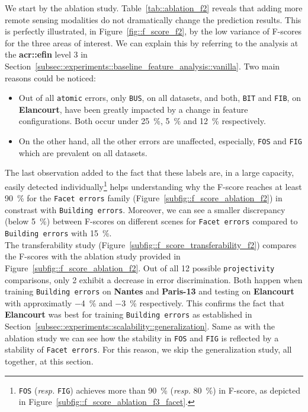         We start by the ablation study.
        Table~\ref{tab::ablation_f2} reveals that adding more remote sensing modalities do not dramatically change the prediction results.
        This is perfectly illustrated, in Figure~\ref{fig::f_score_f2}, by the low variance of F-scores for the three areas of interest.
        We can explain this by referring to the analysis at the \textbf{\gls{acr::efin}} level 3 in Section~\ref{subsec::experiments::baseline_feature_analysis::vanilla}.
        Two main reasons could be noticed:
        \begin{itemize}[label=\(\blacktriangleright\)]
            \item Out of all \texttt{atomic} errors, only \texttt{BUS}, on all datasets, and both, \texttt{BIT} and \texttt{FIB}, on \textbf{Elancourt}, have been greatly impacted by a change in feature configurations.
                    Both occur under \SI{25}{\percent}, \SI{5}{\percent} and \SI{12}{\percent} respectively.
            \item On the other hand, all the other errors are unaffected, especially, \texttt{FOS} and \texttt{FIG} which are prevalent on all datasets.
        \end{itemize}
        The last observation added to the fact that these labels are, in a large capacity, easily detected individually\footnote{
            \texttt{FOS} (\textit{resp.} \texttt{FIG}) achieves more than \SI{90}{\percent} (\textit{resp.} \SI{80}{\percent}) in F-score, as depicted in Figure~\ref{subfig::f_score_ablation_f3_facet}.
        } helps understanding why the F-score reaches at least \SI{90}{\percent} for the \texttt{Facet errors} family (Figure~\ref{subfig::f_score_ablation_f2}) in constrast with \texttt{Building errors}.
        Moreover, we can see a smaller discrepancy (below \SI{5}{\percent}) between F-scores on different scenes for \texttt{Facet errors} compared to \texttt{Building errors} with \SI{15}{\percent}.\\

        The transferability study (Figure~\ref{subfig::f_score_transferability_f2}) compares the F-scores with the ablation study provided in Figure~\ref{subfig::f_score_ablation_f2}.
        Out of all 12 possible \texttt{projectivity} comparisons, only 2 exhibit a decrease in error discrimination.
        Both happen when training \texttt{Building errors} on \textbf{Nantes} and \textbf{Paris-13} and testing on \textbf{Elancourt} with approximatly \SI{-4}{\percent} and \SI{-3}{\percent} respectively.
        This confirms the fact that \textbf{Elancourt} was best for training \texttt{Building errors} as established in Section~\ref{subsec::experiments::scalability::generalization}.
        Same as with the ablation study we can see how the stability in \texttt{FOS} and \texttt{FIG} is reflected by a stability of \texttt{Facet errors}.
        For this reason, we skip the generalization study, all together, at this section.\\

